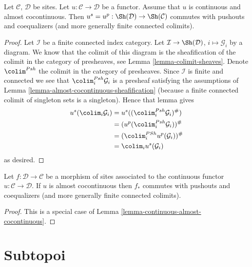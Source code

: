 \begin{lemma}
\label{lemma-continuous-almost-cocontinuous}
Let $\mathcal{C}$, $\mathcal{D}$ be sites.
Let $u : \mathcal{C} \to \mathcal{D}$ be a functor.
Assume that $u$ is continuous and almost cocontinuous.
Then $u^s = u^p : \Sh(\mathcal{D}) \to \Sh(\mathcal{C})$
commutes with pushouts and coequalizers (and more generally
finite connected colimits).
\end{lemma}

\begin{proof}
Let $\mathcal{I}$ be a finite connected index category.
Let $\mathcal{I} \to \Sh(\mathcal{D})$,
$i \mapsto \mathcal{G}_i$ by a diagram. We know that the colimit of
this diagram is the sheafification of the colimit in the category of
presheaves, see
Lemma \ref{lemma-colimit-sheaves}.
Denote $\colim^{Psh}$ the colimit in the category
of presheaves. Since $\mathcal{I}$ is finite and connected
we see that $\colim^{Psh}_i \mathcal{G}_i$
is a presheaf satisfying the assumptions of
Lemma \ref{lemma-almost-cocontinuous-sheafification}
(because a finite connected colimit of singleton sets is a
singleton). Hence that lemma gives
\begin{align*}
u^s(\colim_i \mathcal{G}_i) & =
u^s((\colim^{Psh}_i \mathcal{G}_i)^\#) \\
& = (u^p(\colim^{Psh}_i \mathcal{G}_i))^\# \\
& = (\colim^{PSh}_i u^p(\mathcal{G}_i))^\# \\
& = \colim_i u^s(\mathcal{G}_i)
\end{align*}
as desired.
\end{proof}

\begin{lemma}
\label{lemma-morphism-of-sites-almost-cocontinuous}
Let $f : \mathcal{D} \to \mathcal{C}$ be a morphism of sites
associated to the continuous functor $u : \mathcal{C} \to \mathcal{D}$.
If $u$ is almost cocontinuous then $f_*$ commutes with
pushouts and coequalizers (and more generally finite connected colimits).
\end{lemma}

\begin{proof}
This is a special case of Lemma \ref{lemma-continuous-almost-cocontinuous}.
\end{proof}








\section{Subtopoi}
\label{section-subtopoi}

